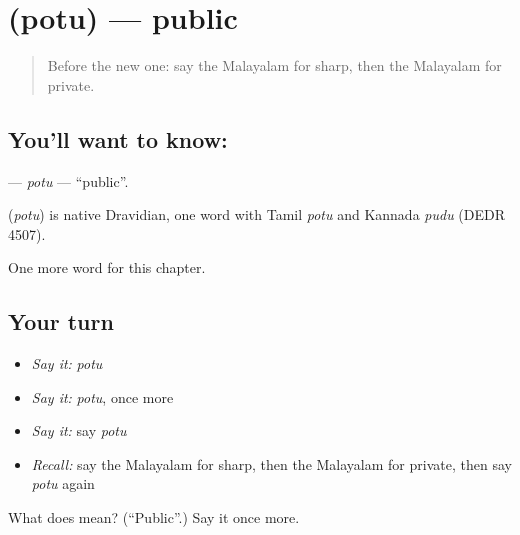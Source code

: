 \section[\texorpdfstring{\ml{പൊതു} (potu)}{പൊതു (potu)}]{ (potu) — public}

\label{lesson:ML-C244-potu}



\begin{quote}
Before the new one: say the Malayalam for sharp, then the Malayalam for private.
\end{quote}

\subsection*{You'll want to know: }
\textbf{} — \emph{potu} — \textquotedblleft{}public\textquotedblright{}.

\begin{cousinweb}
\textbf{} (\emph{potu}) is native Dravidian, one word with Tamil \emph{potu} and Kannada \emph{pudu} (DEDR 4507).
\end{cousinweb}

\begin{grammarlens}[title={What you've built}]
One more word for this chapter.
\end{grammarlens}

\subsection*{Your turn}
\begin{itemize}
\raggedright
  \item \emph{Say it:} \emph{potu}
  \item \emph{Say it:} \emph{potu}, once more
  \item \emph{Say it:} say \emph{potu}
  \item \emph{Recall:} say the Malayalam for sharp, then the Malayalam for private, then say \emph{potu} again
\end{itemize}

\begin{tcolorbox}[breakable,colback=teal!4,colframe=teal!35!black,title={Before you move on}]
What does  mean? (\textquotedblleft{}Public\textquotedblright{}.) Say it once more.
\end{tcolorbox}
